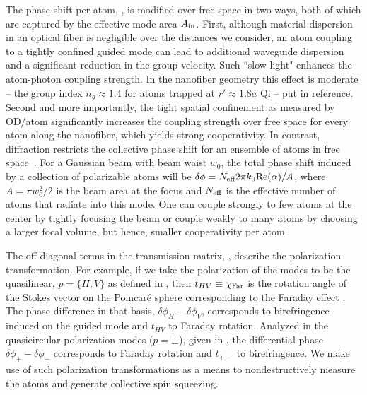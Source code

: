 \documentclass[preprint, aps,pra,onecolumn]{revtex4-1} %
\begin{document}
The phase shift per atom, , is modified over free space in two ways, both of which are captured by the effective mode area $A_{\rm in}$. 
First, although material dispersion in an optical fiber is negligible over the distances we consider, an atom coupling to a tightly confined guided mode can lead to additional waveguide dispersion and a significant reduction in the group velocity.  Such ``slow light" enhances the atom-photon coupling strength. 
In the nanofiber geometry this effect is moderate -- the group index $n_g \approx 1.4$ for atoms trapped at $r' \approx1.8 a$ {\color{red} Qi -- put in reference}.  Second and more importantly, the tight spatial confinement as measured by OD/atom significantly increases the coupling strength over free space for every atom along the nanofiber, which yields strong cooperativity. In contrast, diffraction restricts the collective phase shift for an ensemble of atoms in free space~\cite{tanji-suzuki_chapter_2011, baragiola_three-dimensional_2014}.  For a Gaussian beam with beam waist $w_0$, the total phase shift induced by a collection of polarizable atoms will be $\delta \phi = N_{\text{eff}} 2 \pi k_0 {\rm Re}({\alpha})/A$, where $A = \pi w^2_0/2$ is the beam area at the focus and $N_{\text{eff}}$ is the effective number of atoms that radiate into this mode.  One can couple strongly to few atoms at the center by tightly focusing the beam or couple weakly to many atoms by choosing a larger focal volume, but hence, smaller cooperativity per atom.  

The off-diagonal terms in the transmission matrix, , describe the polarization transformation. For example, if we take the polarization of the modes to be the quasilinear, $p = \{H,V\}$ as defined in , then $t_{HV} \equiv \chi_{\rm Far}$ is the rotation angle of the Stokes vector on the Poincar\'{e} sphere corresponding to the Faraday effect \cite{hammerer_quantum_2010, deutsch_quantum_2010}.  
The phase difference in that basis, $\delta  \phi_H - \delta \phi_V$, corresponds to birefringence induced on the guided mode and $t_{HV}$ to Faraday rotation.  
Analyzed in the quasicircular polarization modes ($p=\pm$), given in , the differential phase $\delta \phi_+ -\delta  \phi_-$ corresponds to Faraday rotation and $t_{+-}$ to birefringence.  
We make use of such polarization transformations as a means to nondestructively measure the atoms and generate collective spin squeezing.


\end{document}
